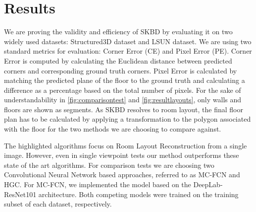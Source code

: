 \section{Results}
\label{sec:results}
We are proving the validity and efficiency of SKBD by evaluating it on two widely used datasets: Structured3D dataset\cite{zheng2020structured3d} and LSUN dataset\cite{zhang2015large}. We are using two standard metrics for evaluation: Corner Error (CE) and Pixel Error (PE). Corner Error is computed by calculating the Euclidean distance between predicted corners and corresponding ground truth corners. Pixel Error is calculated by matching the predicted plane of the floor to the ground truth and calculating a difference as a percentage based on the total number of pixels. For the sake of understandability in \autoref{fig:comparisontest} and \autoref{fig:resultlayouts}, only walls and floors are shown as segments. As SKBD resolves to room layout, the final floor plan has to be calculated by applying a transformation to the polygon associated with the floor for the two methods we are choosing to compare against.

The highlighted algorithms\cite{8451365}\cite{10350607} focus on Room Layout Reconstruction from a single image. However, even in single viewpoint tests our method outperforms these state of the art algorithms. For comparison tests we are choosing two Convolutional Neural Network based approaches, referred to as MC-FCN\cite{8451365} and HGC\cite{10350607}. For MC-FCN, we implemented the model based on the DeepLab-ResNet101\cite{chen2017deeplab} architecture. Both competing models were trained on the training subset of each dataset, respectively.

